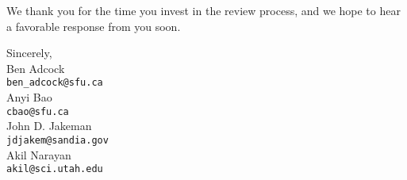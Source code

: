 \documentclass[10pt]{amsart}
\begin{document}
We thank you for the time you invest in the review process, and we hope to hear a favorable response from you soon.

\noindent Sincerely, \\[50pt]
Ben Adcock\\
{\tt ben\_adcock@sfu.ca}\\[5pt]
Anyi Bao\\
{\tt cbao@sfu.ca}\\[5pt]
John D. Jakeman\\
{\tt jdjakem@sandia.gov}\\[5pt]
Akil Narayan\\
{\tt akil@sci.utah.edu}
\end{document}
